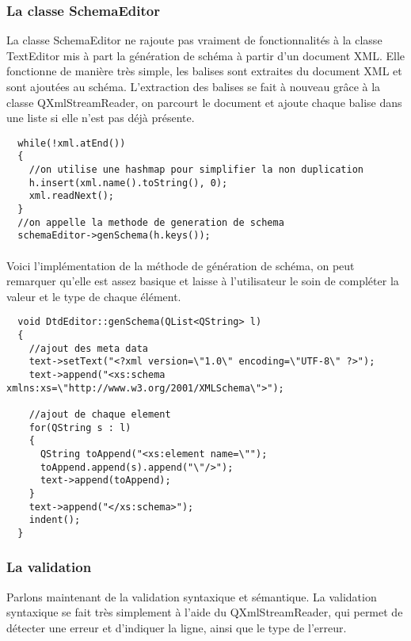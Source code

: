 \paragraph{}
\subsubsection{La classe SchemaEditor}
La classe SchemaEditor ne rajoute pas vraiment de fonctionnalités à la classe TextEditor mis à part la génération de schéma à partir d'un document XML. Elle fonctionne de manière très simple, les balises sont extraites du document XML et sont ajoutées au schéma. L'extraction des balises se fait à nouveau grâce à la classe QXmlStreamReader, on parcourt le document et ajoute chaque balise dans une liste si elle n'est pas déjà présente.

\begin{lstlisting}
  while(!xml.atEnd())
  {
    //on utilise une hashmap pour simplifier la non duplication
    h.insert(xml.name().toString(), 0);
    xml.readNext();
  }
  //on appelle la methode de generation de schema
  schemaEditor->genSchema(h.keys());
\end{lstlisting}
\paragraph{}
Voici l'implémentation de la méthode de génération de schéma, on peut remarquer qu'elle est assez basique et laisse à l'utilisateur le soin de compléter la valeur et le type de chaque élément.
\begin{lstlisting}
  void DtdEditor::genSchema(QList<QString> l)
  {
    //ajout des meta data
    text->setText("<?xml version=\"1.0\" encoding=\"UTF-8\" ?>");
    text->append("<xs:schema xmlns:xs=\"http://www.w3.org/2001/XMLSchema\">");

    //ajout de chaque element
    for(QString s : l)
    {
      QString toAppend("<xs:element name=\"");
      toAppend.append(s).append("\"/>");
      text->append(toAppend);
    }
    text->append("</xs:schema>");
    indent();
  }

\end{lstlisting}
\paragraph{}
\subsubsection{La validation}
Parlons maintenant de la validation syntaxique et sémantique. La validation syntaxique se fait très simplement à l'aide du QXmlStreamReader, qui permet de détecter une erreur et d'indiquer la ligne, ainsi que le type de l'erreur.

